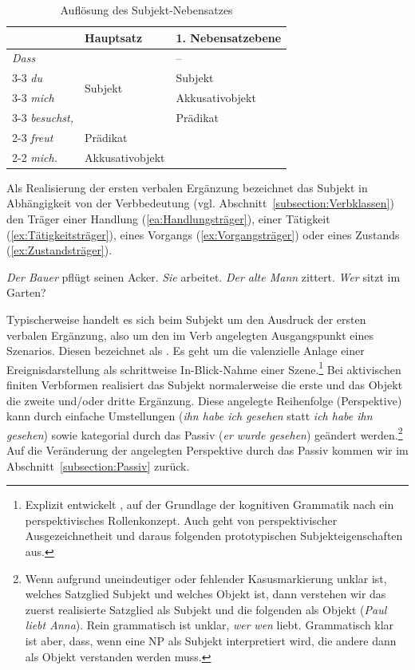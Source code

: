 \begin{table}
  \centering
  \begin{tabular}{l|l|l}
      & Hauptsatz & 1. Nebensatzebene \\
    \hline
    \textit{Dass} & \multirow{4}{*}{Subjekt} & -- \\ \cline{3-3}
    \textit{du} & & Subjekt \\ \cline{3-3}
    \textit{mich} & & Akkusativobjekt \\ \cline{3-3}
    \textit{besuchst,} & & Prädikat  \\ \cline{2-3}
    \textit{freut} & Prädikat &  \\ \cline{2-2} 
    \textit{mich.} & Akkusativobjekt &  \\  
    \hline 
  \end{tabular}
  \caption{Auflösung des Subjekt-Nebensatzes}
  \label{tab:SubjNS}
\end{table}

Als Realisierung der ersten verbalen Ergänzung bezeichnet das Subjekt in Abhängigkeit von der Verbbedeutung (vgl. Abschnitt~\ref{subsection:Verbklassen}) den Träger einer Handlung (\ref{ea:Handlungsträger}), einer Tätigkeit (\ref{ex:Tätigkeitsträger}), eines Vorgangs (\ref{ex:Vorgangsträger}) oder eines Zustands (\ref{ex:Zustandsträger}).

\ea \label{ea:Subjektrollen}
\ea \label{ea:Handlungsträger} \textit{Der Bauer} pflügt seinen Acker.
\ex \label{ex:Tätigkeitsträger} \textit{Sie} arbeitet.
\ex \label{ex:Vorgangsträger} \textit{Der alte Mann} zittert.
\ex \label{ex:Zustandsträger} \textit{Wer} sitzt im Garten?
\z 
\z 

Typischerweise handelt es sich beim Subjekt um den Ausdruck der ersten verbalen Ergänzung, also um den im Verb angelegten Ausgangspunkt eines Szenarios. Diesen bezeichnet \citet[139]{Erben1980} als . Es geht um die valenzielle Anlage einer Ereignisdarstellung als schrittweise In-Blick-Nahme einer Szene.\footnote{Explizit entwickelt \citet[211--212]{Welke1988}, \citet[111]{Welke2005} auf der Grundlage der kognitiven Grammatik nach \citet{Langacker1987} ein perspektivisches Rollenkonzept. Auch \citet[308--309]{Eisenberg2020_Satz} geht von perspektivischer Ausgezeichnetheit und daraus folgenden prototypischen Subjekteigenschaften aus.} Bei aktivischen finiten Verbformen realisiert das Subjekt normalerweise die erste und das Objekt die zweite und/oder dritte Ergänzung. Diese angelegte Reihenfolge (Perspektive) kann durch einfache Umstellungen (\textit{ihn habe ich gesehen} statt \textit{ich habe ihn gesehen}) sowie kategorial \zB durch das Passiv (\textit{er wurde gesehen}) geändert werden.\footnote{Wenn aufgrund uneindeutiger oder fehlender Kasusmarkierung unklar ist, welches Satzglied Subjekt und welches Objekt ist, dann verstehen wir das zuerst realisierte Satzglied als Subjekt und die folgenden als Objekt (\textit{Paul liebt Anna}). Rein grammatisch ist unklar, \textit{wer} \textit{wen} liebt. Grammatisch klar ist aber, dass, wenn eine NP als Subjekt interpretiert wird, die andere dann als Objekt verstanden werden muss.} Auf die Veränderung der angelegten Perspektive durch das Passiv kommen wir im Abschnitt~\ref{subsection:Passiv} zurück.

